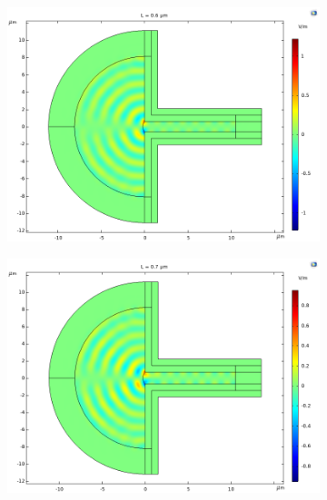\begin{figure}
    \begin{subfigure}[t]{0.4\textwidth}
        \centering
        \includegraphics[width=\textwidth]{figures/Ex_06.png}
        \caption{}
    \end{subfigure}
    \begin{subfigure}[t]{0.4\textwidth}
        \centering
        \includegraphics[width=\textwidth]{figures/Ex_07.png}
        \caption{}
    \end{subfigure}
    

\end{figure}
